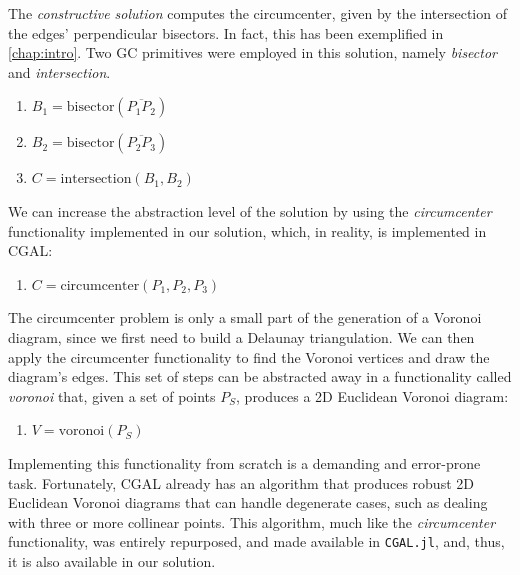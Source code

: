 The \textit{constructive solution} computes the circumcenter, given by the
intersection of the edges' perpendicular bisectors.  In fact, this has been
exemplified in \cref{chap:intro}.  Two \ac{GC} primitives were employed in this
solution, namely \textit{bisector} and \textit{intersection}.

\begin{enumerate}
  \item $B_1 = \mathrm{bisector}\left(\overline{P_1 P_2}\right)$
  \item $B_2 = \mathrm{bisector}\left(\overline{P_2 P_3}\right)$
  \item $C = \mathrm{intersection}\left(B_1, B_2\right)$
\end{enumerate}

We can increase the abstraction level of the solution by using the
\textit{circumcenter} functionality implemented in our solution, which, in
reality, is implemented in \ac{CGAL}:

\begin{enumerate}
  \item $C = \mathrm{circumcenter}\left(P_1, P_2, P_3\right)$
\end{enumerate}

The circumcenter problem is only a small part of the generation of a Voronoi
diagram, since we first need to build a Delaunay triangulation.  We can then 
apply the $\mathrm{circumcenter}$ functionality to find the Voronoi vertices and
draw the diagram's edges.  This set of steps can be abstracted away in a
functionality called \textit{voronoi} that, given a set of points $P_S$,
produces a 2D Euclidean Voronoi diagram:

\begin{enumerate}
  \item $V = \mathrm{voronoi}\left(P_S\right)$
\end{enumerate}

Implementing this functionality from scratch is a demanding and error-prone
task.  Fortunately, \ac{CGAL} already has an algorithm that produces robust 2D
Euclidean Voronoi diagrams that can handle degenerate cases, such as dealing
with three or more collinear points.  This algorithm, much like the
\textit{circumcenter} functionality, was entirely repurposed, and made available
in \texttt{CGAL.jl}, and, thus, it is also available in our solution.
